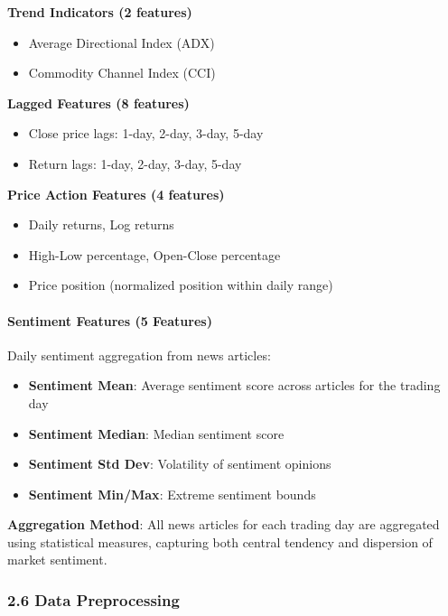 \documentclass[
]{article}
\begin{document}
\textbf{Trend Indicators (2 features)}

\begin{itemize}
\item
  Average Directional Index (ADX)
\item
  Commodity Channel Index (CCI)
\end{itemize}

\textbf{Lagged Features (8 features)}

\begin{itemize}
\item
  Close price lags: 1-day, 2-day, 3-day, 5-day
\item
  Return lags: 1-day, 2-day, 3-day, 5-day
\end{itemize}

\textbf{Price Action Features (4 features)}

\begin{itemize}
\item
  Daily returns, Log returns
\item
  High-Low percentage, Open-Close percentage
\item
  Price position (normalized position within daily range)
\end{itemize}

\paragraph{Sentiment Features (5
Features)}\label{sentiment-features-5-features}

Daily sentiment aggregation from news articles:

\begin{itemize}
\item
  \textbf{Sentiment Mean}: Average sentiment score across articles for
  the trading day
\item
  \textbf{Sentiment Median}: Median sentiment score
\item
  \textbf{Sentiment Std Dev}: Volatility of sentiment opinions
\item
  \textbf{Sentiment Min/Max}: Extreme sentiment bounds
\end{itemize}

\textbf{Aggregation Method}: All news articles for each trading day are
aggregated using statistical measures, capturing both central tendency
and dispersion of market sentiment.

\subsubsection{2.6 Data Preprocessing}\label{26-data-preprocessing}
\end{document}
